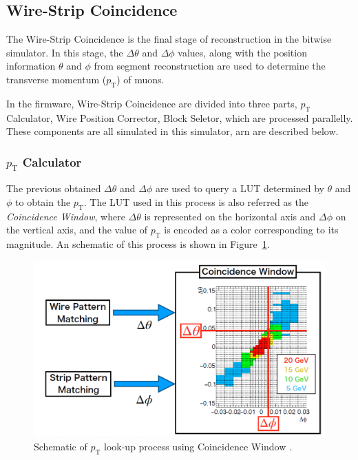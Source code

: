 \subsection{Wire-Strip Coincidence} \label{subsec:WireStripCoin}
The Wire-Strip Coincidence is the final stage of reconstruction in the bitwise simulator. In this stage, the $\Delta\theta$ and $\Delta\phi$ values, along with the position information $\theta$ and $\phi$ from segment reconstruction are used to determine the transverse momentum ($p_{\mathrm{T}}$) of muons.

In the firmware, Wire-Strip Coincidence are divided into three parts, $p_{\mathrm{T}}$ Calculator, Wire Position Corrector, Block Seletor, which are processed parallelly. These components are all simulated in this simulator, arn are described below.

\subsubsection{$p_{\mathrm{T}}$ Calculator}

The previous obtained $\Delta\theta$ and $\Delta\phi$ are used to query a LUT determined by $\theta$ and $\phi$  to obtain the $p_{\mathrm{T}}$. The LUT used in this process is also referred as the \textit{Coincidence Window}, where $\Delta\theta$ is represented on the horizontal axis and $\Delta\phi$ on the vertical axis, and the value of $p_{\mathrm{T}}$ is encoded as a color corresponding to its magnitude. An schematic of this process is shown in Figure~\ref{fig:coin_window}.

\begin{figure}[htbp]
  \centering
  \includegraphics[width=1.0\textwidth]{figs/chapter5/coin_window.png}
  \caption{Schematic of $p_\mathrm{T}$ look-up process using Coincidence Window \cite{EndcapSLPDR}.}
  \label{fig:coin_window}
\end{figure}

